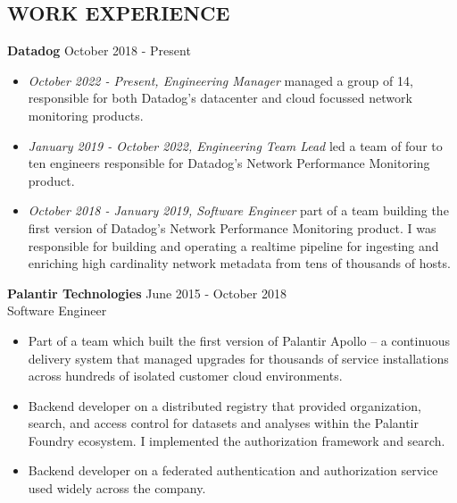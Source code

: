 \documentclass[line,margin]{res}
\begin{document}
\address{leeavital@gmail.com}

\begin{resume}

\section{WORK EXPERIENCE}

{\bf Datadog} \hfill October 2018 - Present \\
\begin{itemize}
  \item \textit{October 2022 - Present, Engineering Manager} managed a group of 14, responsible for both Datadog's datacenter and cloud focussed network monitoring products.
  \item \textit{January 2019 - October 2022, Engineering Team Lead} led a team of four to ten engineers responsible for Datadog's Network Performance Monitoring product.
  \item \textit{October 2018 - January 2019, Software Engineer} part of a team building the first version of Datadog's Network Performance Monitoring product. I was responsible for building and operating a realtime pipeline for ingesting and enriching high cardinality network metadata from tens of thousands of hosts.
\end{itemize}

{\bf Palantir Technologies} \hfill June 2015 - October 2018 \\
Software Engineer
\begin{itemize}
\item Part of a team which built the first version of Palantir Apollo -- a continuous delivery system that managed upgrades for thousands of service installations across hundreds of isolated customer cloud environments.
\item Backend developer on a distributed registry that provided organization, search, and access control for datasets and analyses within the Palantir Foundry ecosystem. I implemented the authorization framework and search.
\item Backend developer on a federated authentication and authorization service used widely across the company.
\end{itemize}



\end{resume}
\end{document}
